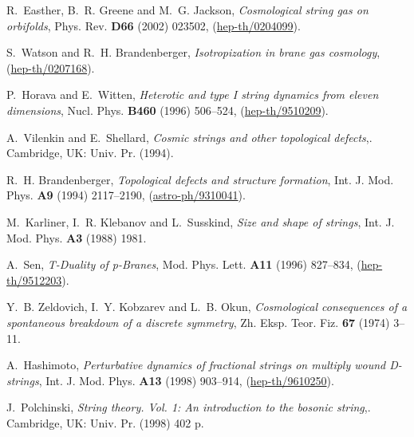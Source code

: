 \documentclass[a4paper,twocolumn,nofootinbib,tightenlines,prd,aps,
               superscriptaddress]{revtex4} %
\begin{document}
\begin{thebibliography}{10}
R.~Easther, B.~R. Greene  and M.~G. Jackson, {\em Cosmological
string gas on
  orbifolds}, Phys. Rev. {\bf D66} (2002) 023502,
(\href{http://arXiv.org/abs/hep-th/0204099}{hep-th/0204099}).

S.~Watson and R.~H. Brandenberger, {\em Isotropization in brane
gas cosmology},
(\href{http://arXiv.org/abs/hep-th/0207168}{hep-th/0207168}).

P.~Horava and E.~Witten, {\em Heterotic and type I string dynamics
from eleven
  dimensions}, Nucl. Phys. {\bf B460} (1996) 506--524,
(\href{http://arXiv.org/abs/hep-th/9510209}{hep-th/9510209}).

A.~Vilenkin and E.~Shellard, {\em Cosmic strings and other
topological
  defects},. Cambridge, UK: Univ. Pr. (1994).

R.~H. Brandenberger, {\em Topological defects and structure
formation}, Int. J.
  Mod. Phys. {\bf A9} (1994) 2117--2190,
(\href{http://arXiv.org/abs/astro-ph/9310041}{astro-ph/9310041}).

M.~Karliner, I.~R. Klebanov  and L.~Susskind, {\em Size and shape
of strings},
  Int. J. Mod. Phys. {\bf A3} (1988)
1981.

A.~Sen, {\em T-Duality of p-Branes}, Mod. Phys. Lett. {\bf A11}
(1996)
  827--834,
(\href{http://arXiv.org/abs/hep-th/9512203}{hep-th/9512203}).

Y.~B. Zeldovich, I.~Y. Kobzarev  and L.~B. Okun, {\em Cosmological
consequences
  of a spontaneous breakdown of a discrete symmetry}, Zh. Eksp. Teor. Fiz. {\bf
  67} (1974)
3--11.

A.~Hashimoto, {\em Perturbative dynamics of fractional strings on
multiply
  wound D-strings}, Int. J. Mod. Phys. {\bf A13} (1998) 903--914,
(\href{http://arXiv.org/abs/hep-th/9610250}{hep-th/9610250}).

J.~Polchinski, {\em String theory. Vol. 1: An introduction to the
bosonic
  string},. Cambridge, UK: Univ. Pr. (1998) 402 p.

\end{thebibliography}\endgroup
\end{document}
